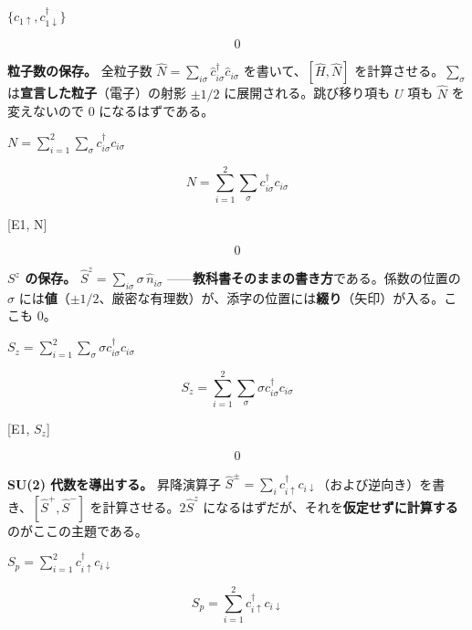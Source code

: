\documentclass[dvipdfmx,a4paper,11pt]{jsarticle}
\begin{document}
$\{c_{1\uparrow}, c^\dagger_{1\downarrow}\}$

\begin{equation}
  0
  \label{eq:E4}
\end{equation}

\textbf{粒子数の保存。} 全粒子数 $\hat N=\sum_{i\sigma}\hat c^\dagger_{i\sigma}\hat c_{i\sigma}$ を書いて、$[\hat H,\hat N]$ を計算させる。$\sum_\sigma$ は\textbf{宣言した粒子}（電子）の射影 $\pm1/2$ に展開される。跳び移り項も $U$ 項も $\hat N$ を変えないので 0 になるはずである。

$N = \sum_{i=1}^{2} \sum_{\sigma} c^\dagger_{i\sigma} c_{i\sigma}$

\begin{equation}
  N = \sum_{i=1}^{2} \sum_{\sigma} c^\dagger_{i\sigma} c_{i\sigma}
  \label{eq:E5}
\end{equation}

[E1, N]

\begin{equation}
  0
  \label{eq:E6}
\end{equation}

\textbf{$S^z$ の保存。} $\hat S^z=\sum_{i\sigma}\sigma\,\hat n_{i\sigma}$ ——\textbf{教科書そのままの書き方}である。係数の位置の $\sigma$ には\textbf{値}（$\pm1/2$、厳密な有理数）が、添字の位置には\textbf{綴り}（矢印）が入る。ここも 0。

$S_z = \sum_{i=1}^{2} \sum_{\sigma} \sigma c^\dagger_{i\sigma} c_{i\sigma}$

\begin{equation}
  S_z = \sum_{i=1}^{2} \sum_{\sigma} \sigma c^\dagger_{i\sigma} c_{i\sigma}
  \label{eq:E7}
\end{equation}

[E1, $S_z$]

\begin{equation}
  0
  \label{eq:E8}
\end{equation}

\textbf{SU(2) 代数を導出する。} 昇降演算子 $\hat S^\pm=\sum_i c^\dagger_{i\uparrow}c_{i\downarrow}$（および逆向き）を書き、$[\hat S^+,\hat S^-]$ を計算させる。$2\hat S^z$ になるはずだが、それを\textbf{仮定せずに計算する}のがここの主題である。

$S_p = \sum_{i=1}^{2} c^\dagger_{i\uparrow} c_{i\downarrow}$

\begin{equation}
  S_p = \sum_{i=1}^{2} c^\dagger_{i\uparrow} c_{i\downarrow}
  \label{eq:E9}
\end{equation}
\end{document}
